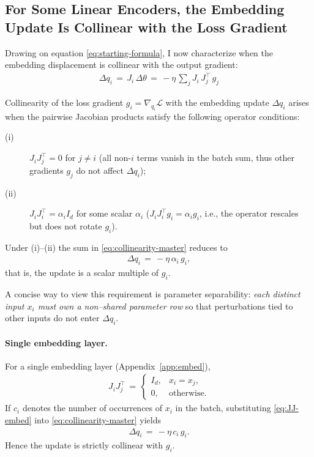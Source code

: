 \subsection{For Some Linear Encoders, the Embedding Update Is Collinear with the Loss Gradient}

Drawing on equation \eqref{eq:starting-formula}, I now characterize when the embedding displacement is collinear with the output gradient: 
\begin{align}
\Delta q_{i} \,=\, J_{i}\,\Delta\theta \,=\, -\eta\,\sum_{j} J_{i}\,J_{j}^{\!\top}\,g_{j} \label{eq:collinearity-master}
\end{align}

Collinearity of the loss gradient $g_i = \nabla_{q_i}\mathcal{L}$ with the embedding update $\Delta q_i$ arises when the pairwise Jacobian products satisfy the following operator conditions:
\begin{description}
\item[(i)] $J_{i}J_{j}^{\!\top}=0$ for $j\neq i$ (all non-$i$ terms vanish in the batch sum, thus other gradients $g_j$ do not affect $\Delta q_i$);
\item[(ii)] $J_{i}J_{i}^{\!\top}=\alpha_i I_d$ for some scalar $\alpha_i$ ($J_{i}J_{i}^{\!\top}g_i=\alpha_i g_i$, i.e., the operator rescales but does not rotate $g_i$).
\end{description}
Under (i)–(ii) the sum in \eqref{eq:collinearity-master} reduces to
\begin{align}
\Delta q_i \,=\, -\eta\,\alpha_i\, g_i,
\end{align}
that is, the update is a scalar multiple of $g_i$.

A concise way to view this requirement is parameter separability: \emph{each distinct input $x_i$ must own a non–shared parameter row} so that perturbations tied to other inputs do not enter $\Delta q_i$.

\paragraph{Single embedding layer.}
For a single embedding layer (Appendix~\ref{app:embed}),
\begin{align}
J_{i}J_{j}^{\!\top} \,=\, \begin{cases}
I_d, & x_i = x_j, \\
0, & \text{otherwise.}
\end{cases} \label{eq:JJ-embed}
\end{align}
If $c_i$ denotes the number of occurrences of $x_i$ in the batch, substituting \eqref{eq:JJ-embed} into \eqref{eq:collinearity-master} yields
\begin{align}
\Delta q_i \,=\, -\eta\,c_i\,g_i.
\end{align}
Hence the update is strictly collinear with $g_i$.

